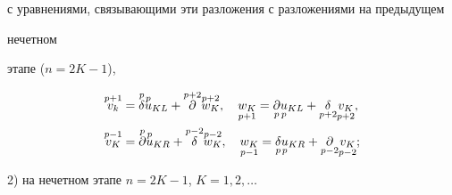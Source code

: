 с уравнениями, связывающими эти разложения с разложениями на предыдущем 


нечетном  


этапе ($n=2K-1$), 


\begin{equation} 


\begin{split} 


\up{p+1}{v_k}&=\up{p}{\delta}\up{p}{u}_{KL}+ 


\up{p+2}{\partial}\up{p+2}{w_K},\quad 


\down{p+1}{w_K}=\down{p}{\partial}\down{p}{u}_{KL}+ 


\down{p+2}{\delta}\down{p+2}{v_K}, \\ 


\up{p-1}{v_K}&=\up{p}{\partial}\up{p}{u}_{KR}+ 


\up{p-2}{\delta}\up{p-2}{w_K},\quad 


\down{p-1}{w_K}=\down{p}{\delta}\down{p}{u}_{KR}+ 


\down{p-2}{\partial}\down{p-2}{v_K}; 


\end{split} 


\end{equation} 


2) на нечетном этапе $n=2K-1$, $K=1,2,\dotsc$ 


